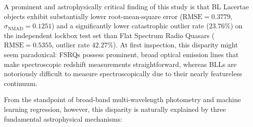 \documentclass[twocolumn,linenumbers,floatfix]{aastex701}
\begin{document}
A prominent and astrophysically critical finding of this study is that BL Lacertae objects exhibit substantially lower root-mean-square error ($\text{RMSE} = 0.3779$, $\sigma_{\text{NMAD}} = 0.1251$) and a significantly lower catastrophic outlier rate ($23.76\%$) on the independent lockbox test set than Flat Spectrum Radio Quasars ($\text{RMSE} = 0.5355$, outlier rate $42.27\%$). At first inspection, this disparity might seem paradoxical: FSRQs possess prominent, broad optical emission lines that make spectroscopic redshift measurements straightforward, whereas BLLs are notoriously difficult to measure spectroscopically due to their nearly featureless continuum.

From the standpoint of broad-band multi-wavelength photometry and machine learning regression, however, this disparity is naturally explained by three fundamental astrophysical mechanisms:
\end{document}

